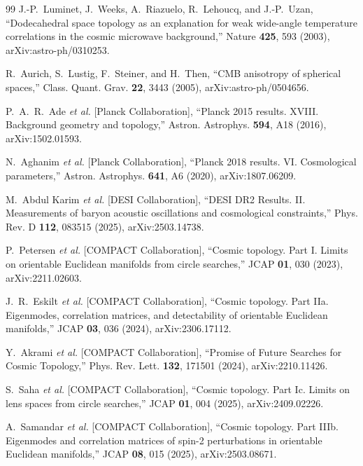 \documentclass[
  aps,
  prd,
  reprint,
  superscriptaddress,
  floatfix,
  nofootinbib,
  longbibliography
]{revtex4-2}
\theoremstyle{plain}
\theoremstyle{definition}
\theoremstyle{remark}
\begin{document}
\begin{sloppypar}
\begin{thebibliography}{99}
J.-P.~Luminet, J.~Weeks, A.~Riazuelo, R.~Lehoucq, and J.-P.~Uzan,
``Dodecahedral space topology as an explanation for weak wide-angle temperature correlations in the cosmic microwave background,''
Nature \textbf{425}, 593 (2003),
arXiv:astro-ph/0310253.

R.~Aurich, S.~Lustig, F.~Steiner, and H.~Then,
``CMB anisotropy of spherical spaces,''
Class. Quant. Grav. \textbf{22}, 3443 (2005),
arXiv:astro-ph/0504656.

P.~A.~R.~Ade \textit{et al.} [Planck Collaboration],
``Planck 2015 results. XVIII. Background geometry and topology,''
Astron. Astrophys. \textbf{594}, A18 (2016),
arXiv:1502.01593.

N.~Aghanim \textit{et al.} [Planck Collaboration],
``Planck 2018 results. VI. Cosmological parameters,''
Astron. Astrophys. \textbf{641}, A6 (2020),
arXiv:1807.06209.

M.~Abdul Karim \textit{et al.} [DESI Collaboration],
``DESI DR2 Results. II. Measurements of baryon acoustic oscillations and cosmological constraints,''
Phys. Rev. D \textbf{112}, 083515 (2025),
arXiv:2503.14738.

P.~Petersen \textit{et al.} [COMPACT Collaboration],
``Cosmic topology. Part I. Limits on orientable Euclidean manifolds from circle searches,''
JCAP \textbf{01}, 030 (2023),
arXiv:2211.02603.

J.~R.~Eskilt \textit{et al.} [COMPACT Collaboration],
``Cosmic topology. Part IIa. Eigenmodes, correlation matrices, and detectability of orientable Euclidean manifolds,''
JCAP \textbf{03}, 036 (2024),
arXiv:2306.17112.

Y.~Akrami \textit{et al.} [COMPACT Collaboration],
``Promise of Future Searches for Cosmic Topology,''
Phys. Rev. Lett. \textbf{132}, 171501 (2024),
arXiv:2210.11426.

S.~Saha \textit{et al.} [COMPACT Collaboration],
``Cosmic topology. Part Ic. Limits on lens spaces from circle searches,''
JCAP \textbf{01}, 004 (2025),
arXiv:2409.02226.

A.~Samandar \textit{et al.} [COMPACT Collaboration],
``Cosmic topology. Part IIIb. Eigenmodes and correlation matrices of spin-2 perturbations in orientable Euclidean manifolds,''
JCAP \textbf{08}, 015 (2025),
arXiv:2503.08671.

\end{thebibliography}
\end{sloppypar}
\end{document}
